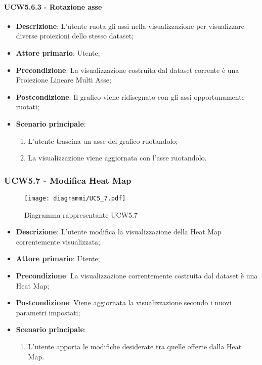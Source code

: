 \paragraph{UCW5.6.3 - Rotazione asse}
\label{par:ucw5.6.3}
\begin{itemize}
    \item \textbf{Descrizione}: L'utente ruota gli assi nella visualizzazione per visualizzare diverse proiezioni dello stesso dataset;
    \item \textbf{Attore primario}: Utente;
    \item \textbf{Precondizione}: La visualizzazione costruita dal dataset corrente è una Proiezione Lineare Multi Asse;
    \item \textbf{Postcondizione}: Il grafico viene ridisegnato con gli assi opportunamente ruotati;
    \item \textbf{Scenario principale}:
    \begin{enumerate}
        \item L'utente trascina un asse del grafico ruotandolo;
	    \item La visualizzazione viene aggiornata con l'asse ruotandolo.
    \end{enumerate}
\end{itemize}

\newpage

\subsubsection{UCW5.7 - Modifica Heat Map}
\label{ssub:ucw5.7}
\begin{figure}[h]
    \centering
    \texttt{[image: diagrammi/UC5\_7.pdf]}
    \caption{Diagramma rappresentante UCW5.7}
    \label{fig:UCW5.7}
\end{figure}


\begin{itemize}
    \item \textbf{Descrizione}: L’utente modifica la visualizzazione della Heat Map correntemente visualizzata;

    \item \textbf{Attore primario}: Utente;

    \item \textbf{Precondizione}:   La visualizzazione correntemente costruita dal dataset è una Heat Map;

    \item \textbf{Postcondizione}:  Viene aggiornata la visualizzazione secondo i nuovi parametri impostati;

	\item \textbf{Scenario principale}:
		\begin{enumerate}
            \item L'utente apporta le modifiche desiderate tra quelle offerte dalla Heat Map.
        \end{enumerate}
\end{itemize}

